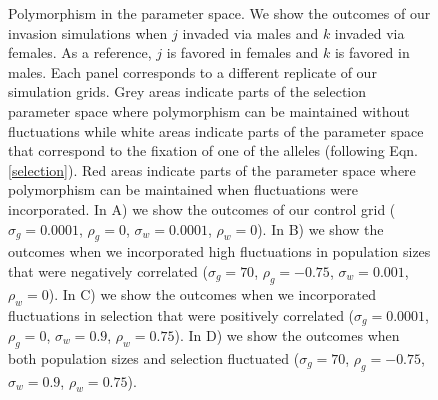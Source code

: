 \begin{refsection}
\begin{figure}[H]
  \caption[Polymorphism in the parameter space]{  Polymorphism in the parameter space. We show the outcomes of our invasion simulations  when $j$ invaded via males and $k$ invaded via females. As a reference, $j$ is favored in females and $k$ is favored in males. Each panel corresponds to a different replicate of our simulation grids. Grey areas indicate parts of the selection parameter space where polymorphism can be maintained without fluctuations while white areas indicate parts of the parameter space that correspond to the fixation of one of the alleles (following Eqn.\ref{selection}). Red areas indicate parts of the parameter space where polymorphism can be maintained when fluctuations were incorporated. In A) we show the outcomes of our control grid ($\sigma_{g}=0.0001$, $\rho_{g}=0$, $\sigma_{w}=0.0001$, $\rho_{w}=0$). In B) we show the outcomes when we incorporated high fluctuations in population sizes that were negatively correlated ($\sigma_{g}=70$, $\rho_{g}=-0.75$, $\sigma_{w}=0.001$, $\rho_{w}=0$). In C) we show the outcomes when we incorporated fluctuations in selection that were positively correlated  ($\sigma_{g}=0.0001$, $\rho_{g}=0$, $\sigma_{w}=0.9$, $\rho_{w}=0.75$). In D) we show the outcomes when both population sizes and selection fluctuated ($\sigma_{g}=70$, $\rho_{g}=-0.75$, $\sigma_{w}=0.9$, $\rho_{w}=0.75$). }
    \label{fig:outcomes}
\end{figure}


\end{refsection}
